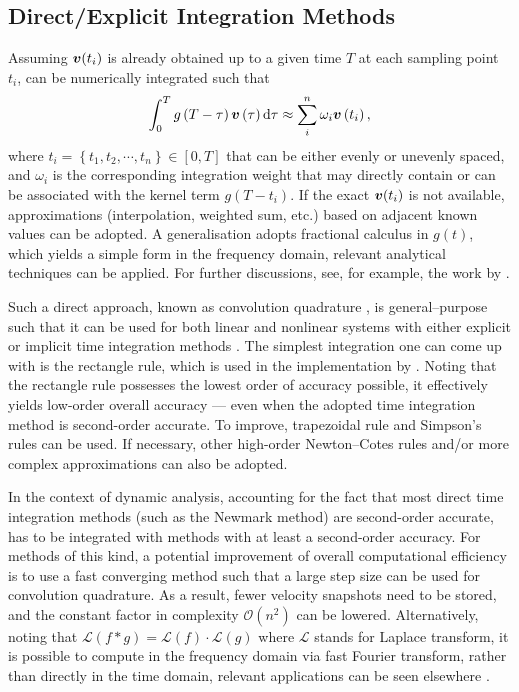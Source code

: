 \subsection{Direct/Explicit Integration Methods}
Assuming $\bm{v}(t_i)$ is already obtained up to a given time $T$ at each sampling point $t_i$,  can be numerically integrated such that
\begin{gather}
\int_0^Tg\left(T-\tau\right)\bm{v}\left(\tau\right)\mathrm{d}\tau\approx\sum_i^n\omega_i\bm{v}\left(t_i\right),
\end{gather}
where $t_i=\left\{t_1,t_2,\cdots,t_n\right\}\in[0,T]$ that can be either evenly or unevenly spaced, and $\omega_i$ is the corresponding integration weight that may directly contain or can be associated \citep{Schaedle2006} with the kernel term $g\left(T-t_i\right)$. If the exact $\bm{v}(t_i)$ is not available, approximations (interpolation, weighted sum, etc.) based on adjacent known values can be adopted. A generalisation adopts fractional calculus \citep[e.g.,][]{Bagley1983,Gaul1999} in $g(t)$, which yields a simple form in the frequency domain, relevant analytical techniques can be applied. For further discussions, see, for example, the work by \citet{Fernandez2019}.

Such a direct approach, known as convolution quadrature \citep[see][and the references therein]{Lubich2004}, is general--purpose such that it can be used for both linear and nonlinear systems with either explicit or implicit time integration methods \citep[see, e.g.,][]{Katsikadelis2019}. The simplest integration one can come up with is the rectangle rule, which is used in the implementation by \citet{Puthanpurayil2014}. Noting that the rectangle rule possesses the lowest order of accuracy possible, it effectively yields low-order overall accuracy --- even when the adopted time integration method is second-order accurate. To improve, trapezoidal rule \citep[e.g.,][]{Liu2014} and Simpson's rules \citep[e.g.,][]{Shen2019} can be used. If necessary, other high-order Newton--Cotes rules and/or more complex approximations \citep{Schaedle2006,Shen2021} can also be adopted.

In the context of dynamic analysis, accounting for the fact that most direct time integration methods (such as the Newmark method) are second-order accurate,  has to be integrated with methods with at least a second-order accuracy. For methods of this kind, a potential improvement of overall computational efficiency is to use a fast converging method \citep{Schaedle2006} such that a large step size can be used for convolution quadrature. As a result, fewer velocity snapshots need to be stored, and the constant factor in complexity $\mathcal{O}\left(n^2\right)$ can be lowered.
Alternatively, noting that $\mathcal{L}\left(f*g\right)=\mathcal{L}\left(f\right)\cdot\mathcal{L}\left(g\right)$ where $\mathcal{L}$ stands for Laplace transform, it is possible to compute  in the frequency domain via fast Fourier transform, rather than directly in the time domain, relevant applications can be seen elsewhere \citep{Pan2013,Zhao2019}.


